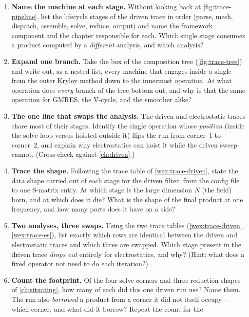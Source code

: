 \exercisessection
\begin{enumerate}[nosep]
  \item \textbf{Name the machine at each stage.} Without looking back at
  \cref{fig:trace-pipeline}, list the lifecycle stages of the driven trace in order
  (parse, mesh, dispatch, assemble, solve, reduce, output) and name the framework
  component and the chapter responsible for each. Which single stage consumes a
  product computed by a \emph{different} analysis, and which analysis?
  \item \textbf{Expand one branch.} Take the  box of the
  composition tree (\cref{fig:trace-tree}) and write out, as a nested list, every
  machine that engages inside a single ---from the outer Krylov
  method down to the innermost operation. At what operation does \emph{every} branch
  of the tree bottom out, and why is that the same operation for GMRES, the V-cycle,
  and the smoother alike?
  \item \textbf{The one line that swaps the analysis.} The driven and electrostatic
  traces share most of their stages. Identify the single operation whose
  \emph{position} (inside the solve loop versus hoisted outside it) flips the run
  from corner~1 to corner~2, and explain why electrostatics can hoist it while the
  driven sweep cannot. (Cross-check against \cref{ch:driven}.)
  \item \textbf{Trace the shape.} Following the trace table of
  \cref{wex:trace-driven}, state the data shape carried out of each stage for the
  driven filter, from the config file to one S-matrix entry. At which stage is the
  large dimension $N$ (the field) born, and at which does it die? What is the shape
  of the final product at one frequency, and how many ports does it have on a side?
  \item \textbf{Two analyses, three swaps.} Using the two trace tables
  (\cref{wex:trace-driven}, \cref{wex:trace-es}), list exactly which rows are
  identical between the driven and electrostatic traces and which three are swapped.
  Which stage present in the driven trace \emph{drops out} entirely for
  electrostatics, and why? (Hint: what does a fixed operator not need to do each
  iteration?)
  \item \textbf{Count the footprint.} Of the four solve corners and three reduction
  shapes of \cref{ch:situating}, how many of each did this one driven run use? Name
  them. The run also \emph{borrowed} a product from a corner it did not itself
  occupy---which corner, and what did it borrow? Repeat the count for the

\end{enumerate}
